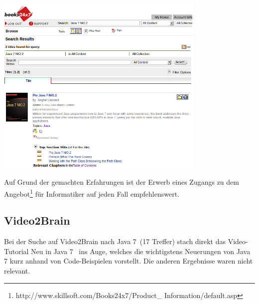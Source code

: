 \begin{center}
\includegraphics[width=10cm]{images/books247.png}
\end{center}

Auf Grund der gemachten Erfahrungen ist der Erwerb eines Zugangs zu dem Angebot\footnote{http://www.skillsoft.com/Books24x7/Product\_ Information/default.asp} für Informatiker auf jeden Fall empfehlenswert.

\subsection{Video2Brain}
Bei der Suche auf Video2Brain nach \glqq Java 7\grqq~(17 Treffer) stach direkt das Video-Tutorial \glqq Neu in Java 7\grqq\cite{v2bJava7}~
ins Auge, welches die wichtigstens Neuerungen von Java 7 kurz anhand von Code-Beispielen vorstellt.
Die anderen Ergebnisse waren nicht relevant.
%




